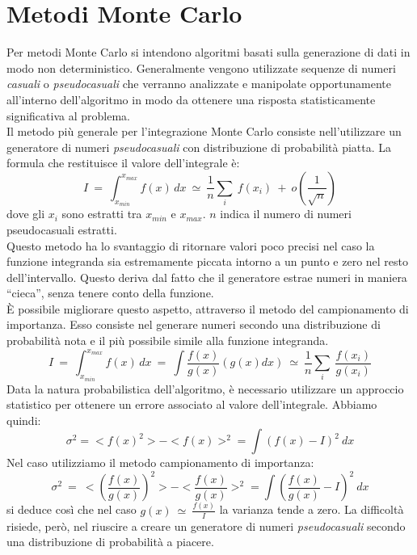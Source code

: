 \section{Metodi Monte Carlo}
\label{sec:Monte Carlo}
Per metodi Monte Carlo si intendono algoritmi basati sulla generazione di dati in modo non deterministico.
Generalmente vengono utilizzate sequenze di numeri \emph{casuali} o \emph{pseudocasuali} che verranno analizzate e 
manipolate opportunamente all'interno dell'algoritmo in modo da ottenere una risposta statisticamente significativa al problema.\\
Il metodo più generale per l'integrazione Monte Carlo consiste nell'utilizzare un generatore di numeri \emph{pseudocasuali} con distribuzione
di probabilità piatta. La formula che restituisce il valore dell'integrale è:
$$
    I \ = \ \int_{x_{min}}^{x_{max}} f(x) \, dx \ \simeq \ \frac{1}{n} \sum_i \ f(x_i) \ + \ o\left(\frac{1}{\sqrt{n}}\right)
$$
dove gli $x_i$ sono estratti tra $x_{min}$ e $x_{max}$. $n$ indica il numero di numeri pseudocasuali estratti.\\
Questo metodo ha lo svantaggio di ritornare valori poco precisi nel caso la funzione integranda sia estremamente piccata intorno a un punto e
zero nel resto dell'intervallo. Questo deriva dal fatto che il generatore estrae numeri in maniera ``cieca'', senza tenere conto della funzione.\\
È possibile migliorare questo aspetto, attraverso il metodo del campionamento di importanza. Esso consiste nel generare numeri secondo una distribuzione
di probabilità nota e il più possibile simile alla funzione integranda. 
$$
 I \ = \ \int_{x_{min}}^{x_{max}} f(x) \, dx \ = \ \int \frac{f(x)}{g(x)} \left( g(x) dx \right) \ \simeq \ \frac{1}{n} \sum_i \ \frac{f(x_i)}{g(x_i)} 
$$
Data la natura probabilistica dell'algoritmo, è necessario utilizzare un approccio statistico per ottenere un errore associato al valore dell'integrale.
Abbiamo quindi:
$$
  \sigma^2 = <{f(x)}^2> - <{f(x)}>^2 = \int (f(x) - I)^2 \ dx  
$$
Nel caso utilizziamo il metodo campionamento di importanza:
$$
\sigma^2 \ = \ <{\left(\frac{f(x)}{g(x)}\right)}^2> - <{\frac{f(x)}{g(x)}}>^2 = \int \left(\frac{f(x)}{g(x)} - I\right)^2 \ dx  
$$
si deduce così che nel caso $ g(x) \ \simeq \ \frac{f(x)}{I}$ la varianza tende a zero.
La difficoltà risiede, però, nel riuscire a creare un generatore di numeri \emph{pseudocasuali} secondo una distribuzione di probabilità a piacere.
